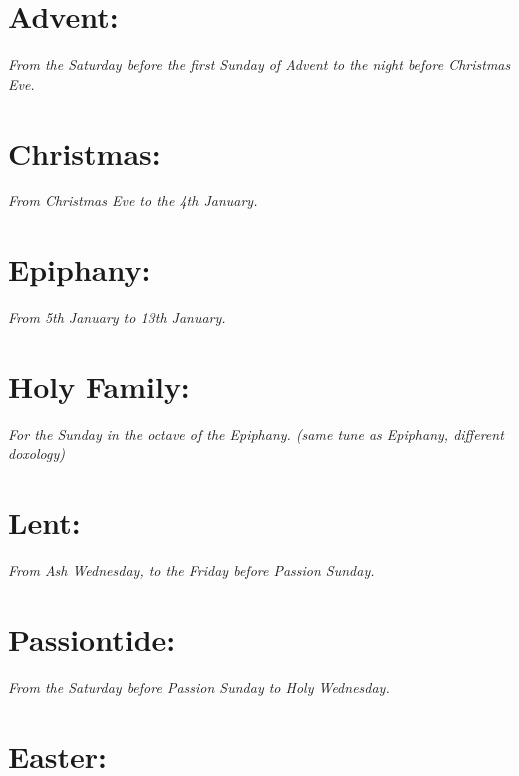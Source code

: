 \documentclass[a5paper,12pt,twoside,openany]{memoir}
\newcommand\rubrics[1]{\textit{#1}}
\begin{document}
\section{Advent:}

\rubrics{From the Saturday before the first Sunday of Advent to the night before Christmas Eve.}


\newpage

\section{Christmas:}

\rubrics{From Christmas Eve to the 4th January.}


\section{Epiphany:}

\rubrics{From 5th January to 13th January.}


\section{Holy Family:}

\rubrics{For the Sunday in the octave of the Epiphany. (same tune as Epiphany, different doxology)}



\section{Lent:}

\rubrics{From Ash Wednesday, to the Friday before Passion Sunday.}


\section{Passiontide:}

\rubrics{From the Saturday before Passion Sunday to Holy Wednesday.}


\section{Easter:}
\end{document}

